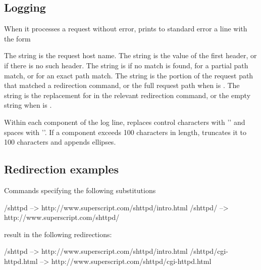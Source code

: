\documentclass{book}
\begin{document}
\subsection{Logging}

When it processes a request without error,  prints to
standard error a line with the form
\begin{code}
\end{code}
The string  is the request host name.
The string  is the value of the first  header,
  or  if there is no such header.
The string  is  if no match is found,
   for a partial path match,
  or  for an exact path match.
The string  is the portion of the request path that matched a
  redirection command,
  or the full request path when  is .
The string  is the replacement for  in the relevant
  redirection command,
  or the empty string when  is .

Within each component of the log line,  replaces control
characters with '' and spaces with '\cmd{_}'.  If a component exceeds 100
characters in length,  truncates it to 100 characters and
appends ellipses.

\subsection{Redirection examples}
Commands specifying the following substitutions
\begin{code}
  /shttpd  --> http://www.superscript.com/shttpd/intro.html
  /shttpd/ --> http://www.superscript.com/shttpd/
\end{code}
result in the following redirections:
\begin{code}
  /shttpd --> http://www.superscript.com/shttpd/intro.html
  /shttpd/cgi-httpd.html --> http://www.superscript.com/shttpd/cgi-httpd.html
\end{code}
\end{document}
